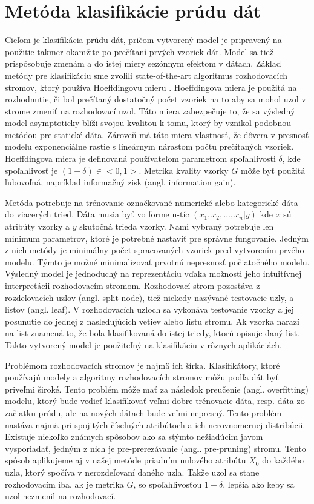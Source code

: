 \section{Metóda klasifikácie prúdu dát}
\label{method-klasifikacia-prudu-dat}
Cieľom je klasifikácia prúdu dát, pričom vytvorený model je pripravený na použitie takmer okamžite po prečítaní prvých vzoriek dát. Model sa tiež prispôsobuje zmenám a do istej miery sezónnym efektom v dátach. Základ metódy pre klasifikáciu sme zvolili state-of-the-art algoritmus rozhodovacích stromov, ktorý používa Hoeffdingovu mieru \citep{domingos2000mining, gaber2005mining, krempl2014open}. Hoeffdingova miera je použitá na rozhodnutie, či bol prečítaný dostatočný počet vzoriek na to aby sa mohol uzol v strome zmeniť na rozhodovací uzol. Táto miera zabezpečuje to, že sa výsledný model asymptoticky blíži svojou kvalitou k tomu, ktorý by vznikol podobnou metódou pre statické dáta. Zároveň má táto miera vlastnosť, že  dôvera v presnosť modelu exponenciálne rastie s lineárnym nárastom počtu prečítaných vzoriek. Hoeffdingova miera je definovaná používateľom parametrom spoľahlivosti $\delta$, kde spoľahlivosť je $(1-\delta) \in <0,1>$. Metrika kvality vzorky $G$ môže byť použitá ľubovoľná, napríklad informačný zisk (angl. information gain).
\par
Metóda potrebuje na trénovanie označkované numerické alebo kategorické dáta do viacerých tried. Dáta musia byť vo forme n-tíc $(x_1, x_2, ..., x_n | y)$ kde $x$ sú atribúty vzorky a $y$ skutočná trieda vzorky. Nami vybraný potrebuje len minimum parametrov, ktoré je potrebné nastaviť pre správne fungovanie. Jedným z nich metódy je minimálny počet spracovaných vzoriek pred vytvorením prvého modelu. Týmto je možné minimalizovať prvotnú nepresnosť počiatočného modelu. Výsledný model je jednoduchý na reprezentáciu vďaka možnosti jeho intuitívnej interpretácii rozhodovacím stromom. Rozhodovací strom pozostáva z rozdeľovacích uzlov (angl. split node), tiež niekedy nazývané testovacie uzly, a listov (angl. leaf). V rozhodovacích uzloch sa vykonáva testovanie vzorky a jej posunutie do jednej z nasledujúcich vetiev alebo listu stromu. Ak vzorka narazí na list znamená to, že bola klasifikovaná do istej triedy, ktorú opisuje daný list. Takto vytvorený model je použiteľný na klasifikáciu v rôznych aplikáciách.
\par
Problémom rozhodovacích stromov je najmä ich šírka. Klasifikátory, ktoré používajú modely a algoritmy rozhodovacích stromov môžu podľa dát byť priveľmi široké. Tento problém môže mať za následok preučenie (angl. overfitting) modelu, ktorý bude vedieť klasifikovať veľmi dobre trénovacie dáta, resp. dáta zo začiatku prúdu, ale na nových dátach bude veľmi nepresný. Tento problém nastáva najmä pri spojitých číselných atribútoch a ich nerovnomernej distribúcii. Existuje niekoľko známych spôsobov ako sa stýmto nežiadúcim javom vysporiadať, jedným z nich je pre-prerezávanie (angl. pre-pruning) stromu. Tento spôsob aplikujeme aj v našej metóde priadním nulového atribútu $X_0$ do každého uzla, ktorý spočíva v nerozdeľovaní daného uzla. Takže uzol sa stane rozhodovacím iba, ak je metrika $G$, so spoľahlivosťou $1-\delta$, lepšia ako keby sa uzol nezmenil na rozhodovací.
